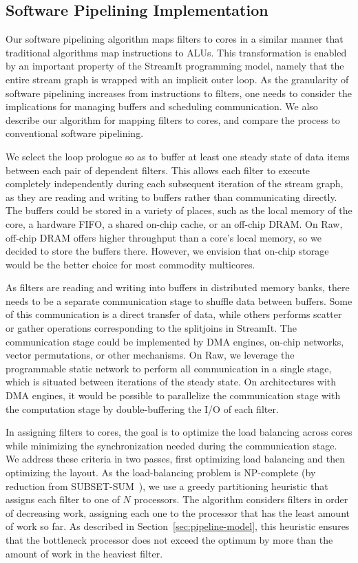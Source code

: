 \subsection{Software Pipelining Implementation}

Our software pipelining algorithm maps filters to cores in a similar
manner that traditional algorithms map instructions to ALUs.  This
transformation is enabled by an important property of the StreamIt
programming model, namely that the entire stream graph is wrapped with
an implicit outer loop.  As the granularity of software pipelining
increases from instructions to filters, one needs to consider the
implications for managing buffers and scheduling communication.  We
also describe our algorithm for mapping filters to cores, and compare
the process to conventional software pipelining.

We select the loop prologue so as to buffer at least one steady state
of data items between each pair of dependent filters.  This allows
each filter to execute completely independently during each subsequent
iteration of the stream graph, as they are reading and writing to
buffers rather than communicating directly.  The buffers could be
stored in a variety of places, such as the local memory of the core, a
hardware FIFO, a shared on-chip cache, or an off-chip DRAM.  On Raw,
off-chip DRAM offers higher throughput than a core's local memory, so
we decided to store the buffers there.  However, we envision that
on-chip storage would be the better choice for most commodity
multicores.

As filters are reading and writing into buffers in distributed memory
banks, there needs to be a separate communication stage to shuffle
data between buffers.  Some of this communication is a direct transfer
of data, while others performs scatter or gather operations
corresponding to the splitjoins in StreamIt.  The communication stage
could be implemented by DMA engines, on-chip networks, vector
permutations, or other mechanisms.  On Raw, we leverage the
programmable static network to perform all communication in a single
stage, which is situated between iterations of the steady state.  On
architectures with DMA engines, it would be possible to parallelize
the communication stage with the computation stage by double-buffering
the I/O of each filter.

In assigning filters to cores, the goal is to optimize the load
balancing across cores while minimizing the synchronization needed
during the communication stage.  We address these criteria in two
passes, first optimizing load balancing and then optimizing the
layout.  As the load-balancing problem is NP-complete (by reduction
from SUBSET-SUM~\cite{sipser97}), we use a greedy partitioning
heuristic that assigns each filter to one of $N$ processors.  The
algorithm considers filters in order of decreasing work, assigning
each one to the processor that has the least amount of work so far.
As described in Section~\ref{sec:pipeline-model}, this heuristic
ensures that the bottleneck processor does not exceed the optimum by
more than the amount of work in the heaviest filter.

